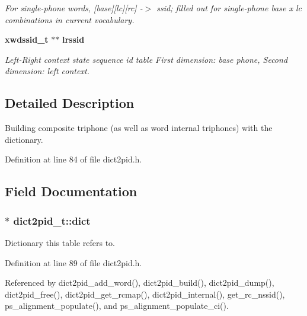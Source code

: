 \begin{DoxyCompactItemize}
\begin{DoxyCompactList}\small\item\em For single-\/phone words, [base][lc][rc] -\/$>$ ssid; filled out for single-\/phone base x lc combinations in current vocabulary. \end{DoxyCompactList}\item 
{\bf xwdssid\+\_\+t} $\ast$$\ast$ {\bf lrssid}\label{structdict2pid__t_a6c1de8a269f6ff37dce3dd8cbec4235a}

\begin{DoxyCompactList}\small\item\em Left-\/\+Right context state sequence id table First dimension\+: base phone, Second dimension\+: left context. \end{DoxyCompactList}\end{DoxyCompactItemize}


\subsection{Detailed Description}
Building composite triphone (as well as word internal triphones) with the dictionary. 

Definition at line 84 of file dict2pid.\+h.



\subsection{Field Documentation}
\subsubsection[{dict}]{$\ast$ dict2pid\+\_\+t\+::dict}\label{structdict2pid__t_ae1fecad64884980e9d8355844abc3512}


Dictionary this table refers to. 



Definition at line 89 of file dict2pid.\+h.



Referenced by dict2pid\+\_\+add\+\_\+word(), dict2pid\+\_\+build(), dict2pid\+\_\+dump(), dict2pid\+\_\+free(), dict2pid\+\_\+get\+\_\+rcmap(), dict2pid\+\_\+internal(), get\+\_\+rc\+\_\+nssid(), ps\+\_\+alignment\+\_\+populate(), and ps\+\_\+alignment\+\_\+populate\+\_\+ci().

